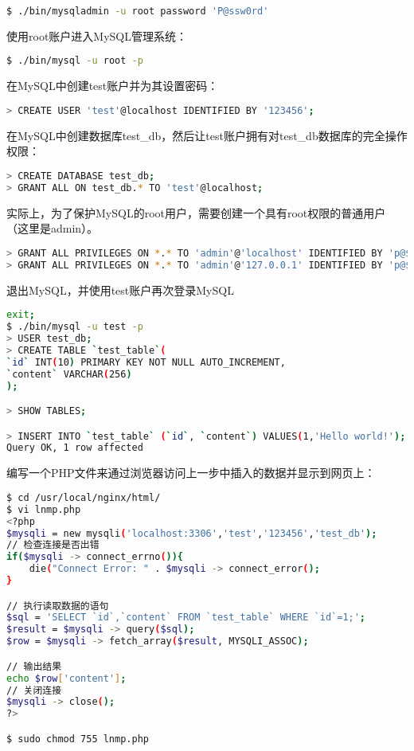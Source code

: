 \begin{lstlisting}[language=bash]
$ ./bin/mysqladmin -u root password 'P@ssw0rd'
\end{lstlisting}

使用root账户进入MySQL管理系统：

\begin{lstlisting}[language=bash]
$ ./bin/mysql -u root -p
\end{lstlisting}

在MySQL中创建test账户并为其设置密码：

\begin{lstlisting}[language=bash]
> CREATE USER 'test'@localhost IDENTIFIED BY '123456';
\end{lstlisting}

在MySQL中创建数据库test\_db，然后让test账户拥有对test\_db数据库的完全操作权限：


\begin{lstlisting}[language=bash]
> CREATE DATABASE test_db;
> GRANT ALL ON test_db.* TO 'test'@localhost;
\end{lstlisting}

实际上，为了保护MySQL的root用户，需要创建一个具有root权限的普通用户（这里是admin）。


\begin{lstlisting}[language=bash]
> GRANT ALL PRIVILEGES ON *.* TO 'admin'@'localhost' IDENTIFIED BY 'p@$$word';
> GRANT ALL PRIVILEGES ON *.* TO 'admin'@'127.0.0.1' IDENTIFIED BY 'p@$$word';
\end{lstlisting}





退出MySQL，并使用test账户再次登录MySQL

\begin{lstlisting}[language=bash]
exit;
$ ./bin/mysql -u test -p
> USER test_db;
> CREATE TABLE `test_table`(
`id` INT(10) PRIMARY KEY NOT NULL AUTO_INCREMENT,
`content` VARCHAR(256)
);

> SHOW TABLES;

> INSERT INTO `test_table` (`id`, `content`) VALUES(1,'Hello world!');
Query OK, 1 row affected
\end{lstlisting}

编写一个PHP文件来通过浏览器访问上一步中插入的数据并显示到网页上：


\begin{lstlisting}[language=bash]
$ cd /usr/local/nginx/html/
$ vi lnmp.php
<?php
$mysqli = new mysqli('localhost:3306','test','123456','test_db');
// 检查连接是否出错
if($mysqli -> connect_errno()){
	die("Connect Error: " . $mysqli -> connect_error();
}

// 执行读取数据的语句
$sql = 'SELECT `id`,`content` FROM `test_table` WHERE `id`=1;';
$result = $mysqli -> query($sql);
$row = $mysqli -> fetch_array($result, MYSQLI_ASSOC);

// 输出结果
echo $row['content'];
// 关闭连接
$mysqli -> close();
?>

$ sudo chmod 755 lnmp.php
\end{lstlisting}

